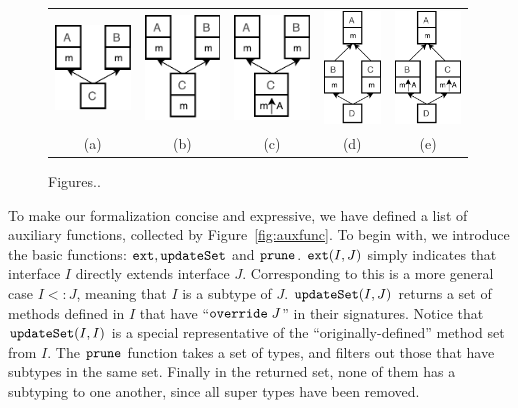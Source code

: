 \begin{figure}[t]
\centering
\vspace{-1ex}
\begin{tabular}{ccccc}
\includegraphics[width=2cm]{pics/p1.pdf}\hspace{4pt} &
\includegraphics[width=2cm]{pics/p2.pdf}\hspace{4pt} &
\includegraphics[width=2cm]{pics/p3.pdf}\hspace{4pt} &
\includegraphics[height=3cm]{pics/p4.pdf}\hspace{4pt} &
\includegraphics[height=3cm]{pics/p5.pdf}\hspace{4pt} \\
(a) & (b) & (c) & (d) & (e)
\end{tabular}
\caption{Figures..}\label{fig:pegasus}
\end{figure}


To make our formalization concise and expressive, we have defined a list of
auxiliary functions, collected by Figure~\ref{fig:auxfunc}. To begin with, we
introduce the basic functions: $\texttt{ext}, \texttt{updateSet}$ and $\texttt{prune}$. $\texttt{ext}(I, J)$
simply indicates that interface $I$ directly extends interface $J$. Corresponding
to this is a more general case $I <: J$, meaning that $I$ is a subtype of $J$.
$\texttt{updateSet}(I, J)$ returns a set of methods defined in $I$ that have ``$\texttt{override} \; J$''
in their signatures. Notice that $\texttt{updateSet}(I, I)$ is a special representative of
the ``originally-defined'' method set from $I$. The $\texttt{prune}$ function takes a set of
types, and filters out those that have subtypes in the same set. Finally in the returned set,
none of them has a subtyping to one another, since all super types have been removed.

